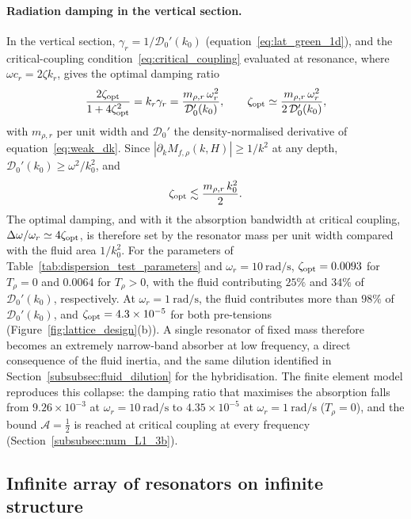 \paragraph{Radiation damping in the vertical section.} In the vertical section, $\gamma_r=1/\mathcal{D}_0'(k_0)$ (equation~\eqref{eq:lat_green_1d}), and the critical-coupling condition~\eqref{eq:critical_coupling} evaluated at resonance, where $\omega c_r=2\zeta k_r$, gives the optimal damping ratio
\begin{equation}\label{eq:zeta_opt}
    \frac{2\zeta_{\rm opt}}{1+4\zeta_{\rm opt}^2}=k_r\gamma_r=\frac{m_{\rho,r}\,\omega_r^2}{\mathcal{D}_0'(k_0)},
    \qquad
    \zeta_{\rm opt}\simeq\frac{m_{\rho,r}\,\omega_r^2}{2\,\mathcal{D}_0'(k_0)},
\end{equation}
with $m_{\rho,r}$ per unit width and $\mathcal{D}_0'$ the density-normalised derivative of equation~\eqref{eq:weak_dk}. Since $|\partial_kM_{f,\rho}(k,H)|\ge1/k^2$ at any depth, $\mathcal{D}_0'(k_0)\ge\omega^2/k_0^2$, and
\begin{equation}\label{eq:zeta_bound}
    \zeta_{\rm opt}\lesssim\frac{m_{\rho,r}\,k_0^2}{2}.
\end{equation}
The optimal damping, and with it the absorption bandwidth at critical coupling, $\Delta\omega/\omega_r\simeq4\zeta_{\rm opt}$, is therefore set by the resonator mass per unit width compared with the fluid area $1/k_0^2$. For the parameters of Table~\ref{tab:dispersion_test_parameters} and $\omega_r=10~\si{\radian\per\second}$, $\zeta_{\rm opt}=0.0093$ for $T_\rho=0$ and $0.0064$ for $T_\rho>0$, with the fluid contributing $25\%$ and $34\%$ of $\mathcal{D}_0'(k_0)$, respectively. At $\omega_r=1~\si{\radian\per\second}$, the fluid contributes more than $98\%$ of $\mathcal{D}_0'(k_0)$, and $\zeta_{\rm opt}=4.3\times10^{-5}$ for both pre-tensions (Figure~\ref{fig:lattice_design}(b)). A single resonator of fixed mass therefore becomes an extremely narrow-band absorber at low frequency, a direct consequence of the fluid inertia, and the same dilution identified in Section~\ref{subsubsec:fluid_dilution} for the hybridisation. {\color{red}The finite element model reproduces this collapse: the damping ratio that maximises the absorption falls from $9.26\times10^{-3}$ at $\omega_r=10~\si{\radian\per\second}$ to $4.35\times10^{-5}$ at $\omega_r=1~\si{\radian\per\second}$ ($T_\rho=0$), and the bound $\mathcal{A}=\tfrac12$ is reached at critical coupling at every frequency (Section~\ref{subsubsec:num_L1_3b}).}

\subsection{Infinite array of resonators on infinite structure}
\label{subsec:infinite_array}

